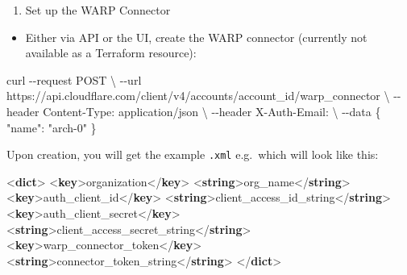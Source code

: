 \documentclass[
]{article}
\newenvironment{Shaded}{\begin{snugshade}}{\end{snugshade}}
\newcommand{\KeywordTok}[1]{\textcolor[rgb]{0.13,0.29,0.53}{\textbf{#1}}}
\newcommand{\NormalTok}[1]{#1}
\providecommand{\tightlist}{%
  \setlength{\itemsep}{0pt}\setlength{\parskip}{0pt}}\usepackage{longtable,booktabs,array}
\begin{document}
\begin{enumerate}
\def\labelenumi{\arabic{enumi}.}
\setcounter{enumi}{3}
\tightlist
\item
  Set up the WARP Connector
\end{enumerate}

\begin{itemize}
\tightlist
\item
  Either via API or the UI, create the WARP connector (currently not
  available as a Terraform resource):
\end{itemize}

\begin{Shaded}
\begin{Highlighting}[numbers=left,,]
\NormalTok{curl {-}{-}request POST \textbackslash{}}
\NormalTok{  {-}{-}url https://api.cloudflare.com/client/v4/accounts/account\_id/warp\_connector \textbackslash{}}
\NormalTok{  {-}{-}header \textquotesingle{}Content{-}Type: application/json\textquotesingle{} \textbackslash{}}
\NormalTok{  {-}{-}header \textquotesingle{}X{-}Auth{-}Email: \textquotesingle{} \textbackslash{}}
\NormalTok{  {-}{-}data \textquotesingle{}\{}
\NormalTok{  "name": "arch{-}0"}
\NormalTok{\}\textquotesingle{}}
\end{Highlighting}
\end{Shaded}

Upon creation, you will get the example \texttt{.xml} e.g.~which will
look like this:

\begin{Shaded}
\begin{Highlighting}[numbers=left,,]
\NormalTok{\textless{}}\KeywordTok{dict}\NormalTok{\textgreater{}}
\NormalTok{ \textless{}}\KeywordTok{key}\NormalTok{\textgreater{}organization\textless{}/}\KeywordTok{key}\NormalTok{\textgreater{}}
\NormalTok{ \textless{}}\KeywordTok{string}\NormalTok{\textgreater{}org\_name\textless{}/}\KeywordTok{string}\NormalTok{\textgreater{}}
\NormalTok{ \textless{}}\KeywordTok{key}\NormalTok{\textgreater{}auth\_client\_id\textless{}/}\KeywordTok{key}\NormalTok{\textgreater{}}
\NormalTok{ \textless{}}\KeywordTok{string}\NormalTok{\textgreater{}client\_access\_id\_string\textless{}/}\KeywordTok{string}\NormalTok{\textgreater{}}
\NormalTok{ \textless{}}\KeywordTok{key}\NormalTok{\textgreater{}auth\_client\_secret\textless{}/}\KeywordTok{key}\NormalTok{\textgreater{}}
\NormalTok{ \textless{}}\KeywordTok{string}\NormalTok{\textgreater{}client\_access\_secret\_string\textless{}/}\KeywordTok{string}\NormalTok{\textgreater{}}
\NormalTok{ \textless{}}\KeywordTok{key}\NormalTok{\textgreater{}warp\_connector\_token\textless{}/}\KeywordTok{key}\NormalTok{\textgreater{}}
\NormalTok{ \textless{}}\KeywordTok{string}\NormalTok{\textgreater{}connector\_token\_string\textless{}/}\KeywordTok{string}\NormalTok{\textgreater{}}
\NormalTok{\textless{}/}\KeywordTok{dict}\NormalTok{\textgreater{}}
\end{Highlighting}
\end{Shaded}
\end{document}
